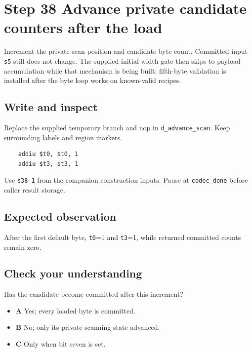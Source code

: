 \section{Step 38 Advance private candidate counters after the load}\label{delta-s38}

Increment the private scan position and candidate byte count. Committed input \texttt{s5} still does not change. The supplied initial width gate then skips to payload accumulation while that mechanism is being built; fifth-byte validation is installed after the byte loop works on known-valid recipes.

\subsection{Write and inspect}
Replace the supplied temporary branch and nop in \texttt{d\_advance\_scan}. Keep surrounding labels and region markers.

\begin{verbatim}
    addiu $t0, $t0, 1
    addiu $t3, $t3, 1
\end{verbatim}
Use \texttt{s38-1} from the companion construction inputs. Pause at \texttt{codec\_done} before caller result storage.

\subsection{Expected observation}
After the first default byte, \texttt{t0}=1 and \texttt{t3}=1, while returned committed counts remain zero.

\subsection{Check your understanding}
Has the candidate become committed after this increment?

\begin{itemize}
\item \textbf{A} Yes; every loaded byte is committed.
\item \textbf{B} No; only its private scanning state advanced.
\item \textbf{C} Only when bit seven is set.
\end{itemize}
